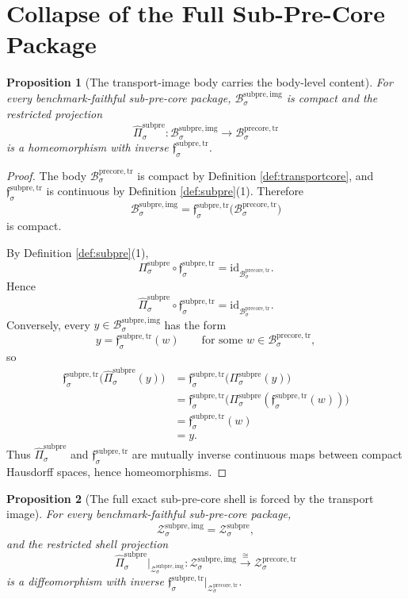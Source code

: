 \documentclass[11pt]{article}
\newcommand{\PreCoreTrBody}[1]{\mathcal B_{#1}^{\mathrm{precore,tr}}}
\newcommand{\PreCoreTrShell}[1]{\mathcal Z_{#1}^{\mathrm{precore,tr}}}
\newcommand{\SubPreCoreProj}[1]{\Pi_{#1}^{\mathrm{subpre}}}
\newcommand{\SubPreCoreTransportMin}[1]{\mathfrak f_{#1}^{\mathrm{subpre,tr}}}
\newcommand{\SubPreCoreShellSet}[1]{\mathcal Z_{#1}^{\mathrm{subpre}}}
\newcommand{\SubPreImgBody}[1]{\mathcal B_{#1}^{\mathrm{subpre,img}}}
\newcommand{\SubPreImgProj}[1]{\widehat{\Pi}_{#1}^{\mathrm{subpre}}}
\newcommand{\SubPreImgShell}[1]{\mathcal Z_{#1}^{\mathrm{subpre,img}}}
\newtheorem{proposition}{Proposition}
\begin{document}
\section{Collapse of the Full Sub-Pre-Core Package}

\begin{proposition}[The transport-image body carries the body-level content]
\label{prop:body}
For every benchmark-faithful sub-pre-core package, \(\SubPreImgBody{\sigma}\) is compact and the restricted projection
\[
\SubPreImgProj{\sigma}:\SubPreImgBody{\sigma}\to\PreCoreTrBody{\sigma}
\]
is a homeomorphism with inverse \(\SubPreCoreTransportMin{\sigma}\).
\end{proposition}

\begin{proof}
The body \(\PreCoreTrBody{\sigma}\) is compact by Definition \ref{def:transportcore}, and \(\SubPreCoreTransportMin{\sigma}\) is continuous by Definition \ref{def:subpre}(1). Therefore
\[
\SubPreImgBody{\sigma}
=
\SubPreCoreTransportMin{\sigma}\bigl(\PreCoreTrBody{\sigma}\bigr)
\]
is compact.

By Definition \ref{def:subpre}(1),
\[
\SubPreCoreProj{\sigma}\circ\SubPreCoreTransportMin{\sigma}
=
\mathrm{id}_{\PreCoreTrBody{\sigma}}.
\]
Hence
\[
\SubPreImgProj{\sigma}\circ\SubPreCoreTransportMin{\sigma}
=
\mathrm{id}_{\PreCoreTrBody{\sigma}}.
\]
Conversely, every \(y\in\SubPreImgBody{\sigma}\) has the form
\[
y=\SubPreCoreTransportMin{\sigma}(w)
\qquad
\text{for some }
w\in\PreCoreTrBody{\sigma},
\]
so
\begin{align*}
\SubPreCoreTransportMin{\sigma}\bigl(\SubPreImgProj{\sigma}(y)\bigr)
&=
\SubPreCoreTransportMin{\sigma}\bigl(\SubPreCoreProj{\sigma}(y)\bigr) \\
&=
\SubPreCoreTransportMin{\sigma}\bigl(\SubPreCoreProj{\sigma}(\SubPreCoreTransportMin{\sigma}(w))\bigr) \\
&=
\SubPreCoreTransportMin{\sigma}(w) \\
&=
y.
\end{align*}
Thus \(\SubPreImgProj{\sigma}\) and \(\SubPreCoreTransportMin{\sigma}\) are mutually inverse continuous maps between compact Hausdorff spaces, hence homeomorphisms.
\end{proof}

\begin{proposition}[The full exact sub-pre-core shell is forced by the transport image]
\label{prop:shell}
For every benchmark-faithful sub-pre-core package,
\[
\SubPreImgShell{\sigma}
=
\SubPreCoreShellSet{\sigma},
\]
and the restricted shell projection
\[
\SubPreImgProj{\sigma}\big|_{\SubPreImgShell{\sigma}}
:
\SubPreImgShell{\sigma}\xrightarrow{\cong}\PreCoreTrShell{\sigma}
\]
is a diffeomorphism with inverse \(\SubPreCoreTransportMin{\sigma}\big|_{\PreCoreTrShell{\sigma}}\).
\end{proposition}
\end{document}
